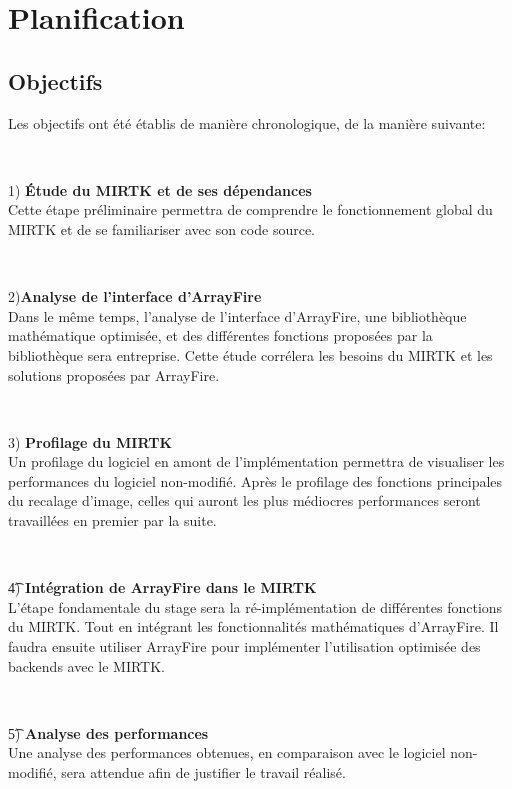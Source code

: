 \documentclass[10pt]{report}
\begin{document}
	\section{Planification}
	\subsection{Objectifs} 
	Les objectifs ont été établis de manière chronologique, de la manière suivante: 
	~\par~\par 
	1) \textbf{Étude du MIRTK et de ses dépendances} \\
	Cette étape préliminaire permettra de comprendre le fonctionnement global du MIRTK et de se familiariser avec son code source. 
	~\par~\par 
	2)\textbf{Analyse de l'interface d'ArrayFire} \\
	Dans le même temps, l'analyse de l'interface d'ArrayFire, une bibliothèque mathématique optimisée, et des différentes fonctions proposées par la bibliothèque sera entreprise. Cette étude corrélera les besoins du MIRTK et les solutions proposées par ArrayFire.
	~\par~\par 
	3) \textbf{Profilage du MIRTK}\\
	Un profilage du logiciel en amont de l'implémentation permettra de visualiser les performances du logiciel non-modifié.	
	Après le profilage des fonctions principales du recalage d'image, celles qui auront les plus médiocres performances seront travaillées en premier par la suite.
	~\par~\par 
	\t 4) \textbf{Intégration de ArrayFire dans le MIRTK} \\
	L'étape fondamentale du stage sera la ré-implémentation de différentes fonctions du MIRTK. Tout en intégrant les fonctionnalités mathématiques d'ArrayFire. Il faudra ensuite utiliser ArrayFire pour implémenter l'utilisation optimisée des backends avec le MIRTK.
	~\par~\par 
	\t 5) \textbf{Analyse des performances} \\
	Une analyse des performances obtenues, en comparaison avec le logiciel non-modifié, sera attendue afin de justifier le travail réalisé.
\end{document}
